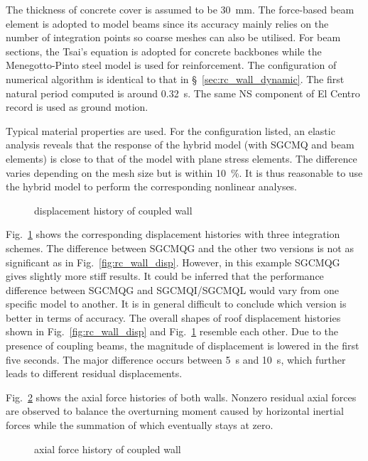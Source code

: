 \documentclass[3p,sort&compress,review,11pt,fleqn]{elsarticle}
\newcommand*{\secref}[1]{\S~\ref{#1}}
\newcommand*{\figref}[1]{Fig.~\ref{#1}}
\begin{document}
The thickness of concrete cover is assumed to be \SI{30}{\milli\meter}. The force-based beam element \citep{Spacone1996} is adopted to model beams since its accuracy mainly relies on the number of integration points \citep{Neuenhofer1997} so coarse meshes can also be utilised. For beam sections, the Tsai's equation \citep{Tsai1988} is adopted for concrete backbones while the Menegotto-Pinto steel model is used for reinforcement. The configuration of numerical algorithm is identical to that in \secref{sec:rc_wall_dynamic}. The first natural period computed is around \SI{0.32}{\second}. The same NS component of El Centro record is used as ground motion.

Typical material properties are used. For the configuration listed, an elastic analysis reveals that the response of the hybrid model (with SGCMQ and beam elements) is close to that of the model with plane stress elements. The difference varies depending on the mesh size but is within \SI{10}{\percent}. It is thus reasonable to use the hybrid model to perform the corresponding nonlinear analyses.

\begin{figure}[htb]
\centering\scriptsize

\caption{displacement history of coupled wall}\label{fig:coupled_wall_disp}
\end{figure}
\figref{fig:coupled_wall_disp} shows the corresponding displacement histories with three integration schemes. The difference between SGCMQG and the other two versions is not as significant as in \figref{fig:rc_wall_disp}. However, in this example SGCMQG gives slightly more stiff results. It could be inferred that the performance difference between SGCMQG and SGCMQI/SGCMQL would vary from one specific model to another. It is in general difficult to conclude which version is better in terms of accuracy. The overall shapes of roof displacement histories shown in \figref{fig:rc_wall_disp} and \figref{fig:coupled_wall_disp} resemble each other. Due to the presence of coupling beams, the magnitude of displacement is lowered in the first five seconds. The major difference occurs between \SI{5}{\second} and \SI{10}{\second}, which further leads to different residual displacements.

\figref{fig:coupled_wall_axial} shows the axial force histories of both walls. Nonzero residual axial forces are observed to balance the overturning moment caused by horizontal inertial forces while the summation of which eventually stays at zero.
\begin{figure}[htb]
\centering\scriptsize

\caption{axial force history of coupled wall}\label{fig:coupled_wall_axial}
\end{figure}
\end{document}
